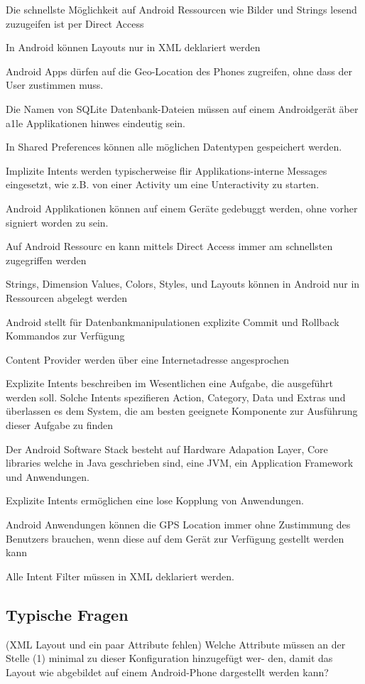 Die schnellste Möglichkeit auf Android Ressourcen wie Bilder und Strings lesend
zuzugeifen ist per Direct Access

In Android können Layouts nur in XML deklariert werden

Android Apps dürfen auf die Geo-Location des Phones zugreifen, ohne dass der
User zustimmen muss.

Die Namen von SQLite Datenbank-Dateien müssen auf einem Androidgerät äber a1le
Applikationen hinwes eindeutig sein.

In Shared Preferences können alle möglichen Datentypen gespeichert werden.

Implizite Intents werden typischerweise flir Applikations-interne Messages
eingesetzt, wie z.B. von einer Activity um eine Unteractivity zu starten.

Android Applikationen können auf einem Geräte gedebuggt werden, ohne vorher
signiert worden zu sein.

Auf Android Ressourc en kann mittels Direct Access immer am
schnellsten zugegriffen werden

Strings, Dimension Values, Colors, Styles, und Layouts können in
Android nur in Ressourcen abgelegt werden

Android stellt für Datenbankmanipulationen explizite Commit und
Rollback Kommandos zur Verfügung

Content Provider werden über eine Internetadresse
angesprochen

Explizite Intents beschreiben im Wesentlichen eine Aufgabe, die
ausgeführt werden soll. Solche Intents spezifieren Action,
Category, Data und Extras und überlassen es dem System, die
am besten geeignete Komponente zur Ausführung dieser
Aufgabe zu finden

Der Android Software Stack besteht auf Hardware Adapation Layer, Core libraries
welche in Java geschrieben sind, eine JVM, ein Application Framework und
Anwendungen.

Explizite Intents ermöglichen eine lose Kopplung von Anwendungen.

Android Anwendungen können die GPS Location immer ohne Zustimmung des Benutzers
brauchen, wenn diese auf dem Gerät zur Verfügung gestellt werden kann

Alle Intent Filter müssen in XML deklariert werden.

\subsection{Typische Fragen}
(XML Layout und ein paar Attribute fehlen) Welche Attribute müssen an der
Stelle (1) minimal zu dieser Konfiguration hinzugefügt wer- den, damit das
Layout wie abgebildet auf einem Android-Phone dargestellt werden kann?

